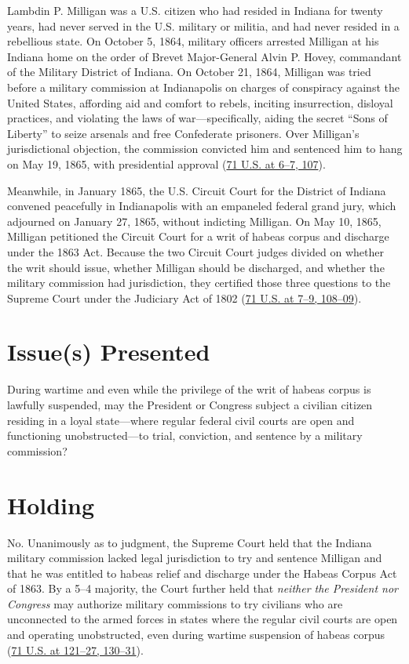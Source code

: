 \documentclass[12pt]{article}
\begin{document}
Lambdin P. Milligan was a U.S. citizen who had resided in Indiana for twenty years, had never served in the U.S. military or militia, and had never resided in a rebellious state. On October 5, 1864, military officers arrested Milligan at his Indiana home on the order of Brevet Major-General Alvin P. Hovey, commandant of the Military District of Indiana. On October 21, 1864, Milligan was tried before a military commission at Indianapolis on charges of conspiracy against the United States, affording aid and comfort to rebels, inciting insurrection, disloyal practices, and violating the laws of war---specifically, aiding the secret ``Sons of Liberty'' to seize arsenals and free Confederate prisoners. Over Milligan's jurisdictional objection, the commission convicted him and sentenced him to hang on May 19, 1865, with presidential approval (\href{https://supreme.justia.com/cases/federal/us/71/2/}{71 U.S. at 6--7, 107}).

Meanwhile, in January 1865, the U.S. Circuit Court for the District of Indiana convened peacefully in Indianapolis with an empaneled federal grand jury, which adjourned on January 27, 1865, without indicting Milligan. On May 10, 1865, Milligan petitioned the Circuit Court for a writ of habeas corpus and discharge under the 1863 Act. Because the two Circuit Court judges divided on whether the writ should issue, whether Milligan should be discharged, and whether the military commission had jurisdiction, they certified those three questions to the Supreme Court under the Judiciary Act of 1802 (\href{https://supreme.justia.com/cases/federal/us/71/2/}{71 U.S. at 7--9, 108--09}).

\section{Issue(s) Presented}

During wartime and even while the privilege of the writ of habeas corpus is lawfully suspended, may the President or Congress subject a civilian citizen residing in a loyal state---where regular federal civil courts are open and functioning unobstructed---to trial, conviction, and sentence by a military commission?

\section{Holding}

No. Unanimously as to judgment, the Supreme Court held that the Indiana military commission lacked legal jurisdiction to try and sentence Milligan and that he was entitled to habeas relief and discharge under the Habeas Corpus Act of 1863. By a 5--4 majority, the Court further held that \textit{neither the President nor Congress} may authorize military commissions to try civilians who are unconnected to the armed forces in states where the regular civil courts are open and operating unobstructed, even during wartime suspension of habeas corpus (\href{https://supreme.justia.com/cases/federal/us/71/2/}{71 U.S. at 121--27, 130--31}).
\end{document}
